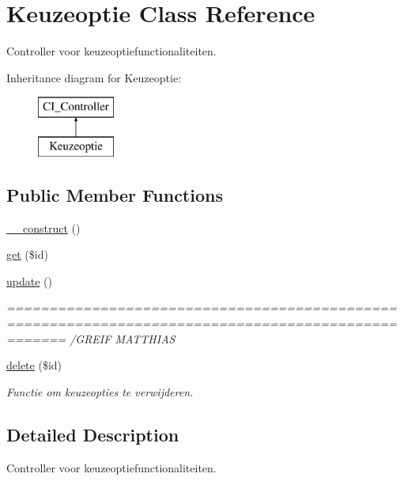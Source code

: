 \hypertarget{class_keuzeoptie}{}\section{Keuzeoptie Class Reference}
\label{class_keuzeoptie}


Controller voor keuzeoptiefunctionaliteiten.  


Inheritance diagram for Keuzeoptie\+:\begin{figure}[H]
\begin{center}
\leavevmode
\includegraphics[height=2.000000cm]{class_keuzeoptie}
\end{center}
\end{figure}
\subsection*{Public Member Functions}
\begin{DoxyCompactItemize}
\item 
\mbox{\hyperlink{class_keuzeoptie_a095c5d389db211932136b53f25f39685}{\+\_\+\+\_\+construct}} ()
\item 
\mbox{\hyperlink{class_keuzeoptie_a50e3bfb586b2f42932a6a93f3fbb0828}{get}} (\$id)
\item 
\mbox{\hyperlink{class_keuzeoptie_a842e4774e3b3601a005b995c02f7e883}{update}} ()
\begin{DoxyCompactList}\small\item\em =================================================================================================== /\+G\+R\+E\+IF M\+A\+T\+T\+H\+I\+AS \end{DoxyCompactList}\item 
\mbox{\hyperlink{class_keuzeoptie_a2f8258add505482d7f00ea26493a5723}{delete}} (\$id)
\begin{DoxyCompactList}\small\item\em Functie om keuzeopties te verwijderen. \end{DoxyCompactList}\end{DoxyCompactItemize}


\subsection{Detailed Description}
Controller voor keuzeoptiefunctionaliteiten. 

